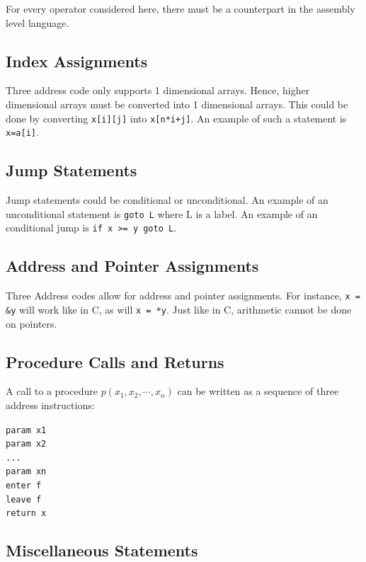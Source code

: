 \documentclass[12pt,letterpaper]{book}
\theoremstyle{definition}
\begin{document}
For every operator considered here, there must be a counterpart in the assembly level language.

\subsection{Index Assignments}

Three address code only supports 1 dimensional arrays. Hence, higher dimensional arrays must be converted into 1 dimensional arrays. This could be done by converting \texttt{x[i][j]} into \texttt{x[n*i+j]}. An example of such a statement is \texttt{x=a[i]}.

\subsection{Jump Statements}

Jump statements could be conditional or unconditional. An example of an unconditional statement is \texttt{goto L} where L is a label. An example of an conditional jump is \texttt{if x >= y goto L}.

\subsection{Address and Pointer Assignments}

Three Address codes allow for address and pointer assignments. For instance, \texttt{x = \&y} will work like in C, as will \texttt{x = *y}. Just like in C, arithmetic cannot be done on pointers.

\subsection{Procedure Calls and Returns}

A call to a procedure $p(x_1,x_2, \cdots, x_n)$ can be written as a sequence of three address instructions:

\texttt{param x1}\\
\texttt{param x2}\\
\texttt{...}\\
\texttt{param xn} \\
\texttt{enter f}\\
\texttt{leave f} \\ 
\texttt{return x} \\

\subsection{Miscellaneous Statements}
\end{document}
